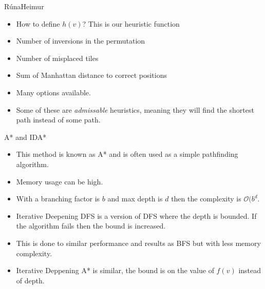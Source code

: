 \documentclass{beamer}
\begin{document}
\begin{frame}[plain]{RúnaHeimur}
    \begin{itemize}
        \item How to define $h(v)$? This is our heuristic function
        \item Number of inversions in the permutation
        \item Number of misplaced tiles
        \item Sum of Manhattan distance to correct positions
        \item Many options available.
        \item Some of these are \emph{admissable} heuristics, meaning they will find the shortest path instead of some path.
    \end{itemize}
\end{frame}

\begin{frame}[plain]{A* and IDA*}
    \begin{itemize}
        \item This method is known as A* and is often used as a simple pathfinding algorithm.
        \item Memory usage can be high.
        \item With a branching factor is $b$ and max depth is $d$ then the complexity is $\mathcal{O}(b^{d}$.
        \item Iterative Deepening DFS is a version of DFS where the depth is bounded. If the algorithm fails then the bound is increased.
        \item This is done to similar performance and results as BFS but with less memory complexity.
        \item Iterative Deppening A* is similar, the bound is on the value of $f(v)$ instead of depth.
    \end{itemize}
\end{frame}
\end{document}
